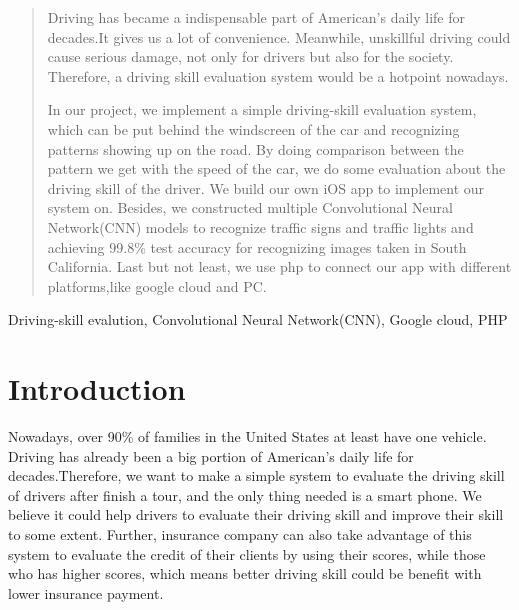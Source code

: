 \documentclass[conference]{IEEEtran}
\begin{document}
\begin{abstract}
Driving has became a indispensable part of American's daily life for decades.It gives us a lot of convenience. Meanwhile, unskillful driving could cause serious damage, not only for drivers but also for the society. Therefore, a driving skill evaluation system would be a hotpoint nowadays. 

In our project, we implement a simple driving-skill evaluation system, which can be put behind the windscreen of the car and recognizing patterns showing up on the road. By doing comparison between the pattern we get with the speed of the car, we do some evaluation about the driving skill of the driver. We build our own  iOS app to implement our system on. Besides, we constructed multiple Convolutional Neural Network(CNN) models to recognize traffic signs and traffic lights and achieving 99.8\% test accuracy for recognizing images taken in South California. Last but not least, we use php to connect our app with different platforms,like google cloud and PC.
\end{abstract}

\begin{IEEEkeywords}
Driving-skill evalution, Convolutional Neural Network(CNN),  Google cloud, PHP
\end{IEEEkeywords}

\section{Introduction}
Nowadays, over 90\% of families in the United States at least have one vehicle. Driving has already been a big portion of American's daily life for decades.Therefore, we want to make a simple system to evaluate the driving skill of drivers after finish a tour, and the only thing needed is a smart phone. We believe it could help drivers to evaluate their driving skill and improve their skill to some extent. Further, insurance company can also take advantage of this system to evaluate the credit of their clients by using their scores, while those who has higher scores, which means better driving skill could be benefit with lower insurance payment.
\end{document}
